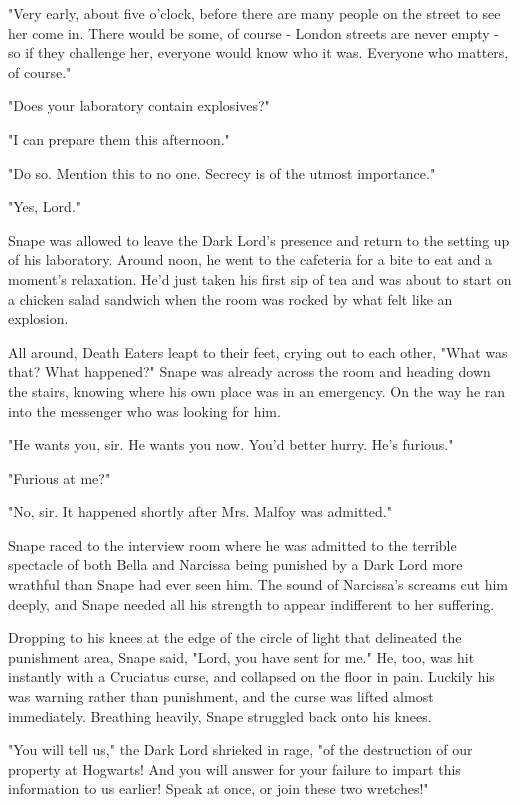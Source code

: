 \documentclass[a4paper,11pt]{article}
\begin{document}
"Very early, about five o'clock, before there are many people on the street to see her come in. There would be some, of course - London streets are never empty - so if they challenge her, everyone would know who it was. Everyone who matters, of course."

"Does your laboratory contain explosives?"

"I can prepare them this afternoon."

"Do so. Mention this to no one. Secrecy is of the utmost importance."

"Yes, Lord."

Snape was allowed to leave the Dark Lord's presence and return to the setting up of his laboratory. Around noon, he went to the cafeteria for a bite to eat and a moment's relaxation. He'd just taken his first sip of tea and was about to start on a chicken salad sandwich when the room was rocked by what felt like an explosion.

All around, Death Eaters leapt to their feet, crying out to each other, "What was that? What happened?" Snape was already across the room and heading down the stairs, knowing where his own place was in an emergency. On the way he ran into the messenger who was looking for him.

"He wants you, sir. He wants you now. You'd better hurry. He's furious."

"Furious at me?"

"No, sir. It happened shortly after Mrs. Malfoy was admitted."

Snape raced to the interview room where he was admitted to the terrible spectacle of both Bella and Narcissa being punished by a Dark Lord more wrathful than Snape had ever seen him. The sound of Narcissa's screams cut him deeply, and Snape needed all his strength to appear indifferent to her suffering.

Dropping to his knees at the edge of the circle of light that delineated the punishment area, Snape said, "Lord, you have sent for me." He, too, was hit instantly with a Cruciatus curse, and collapsed on the floor in pain. Luckily his was warning rather than punishment, and the curse was lifted almost immediately. Breathing heavily, Snape struggled back onto his knees.

"You will tell us," the Dark Lord shrieked in rage, "of the destruction of our property at Hogwarts! And you will answer for your failure to impart this information to us earlier! Speak at once, or join these two wretches!"
\end{document}

